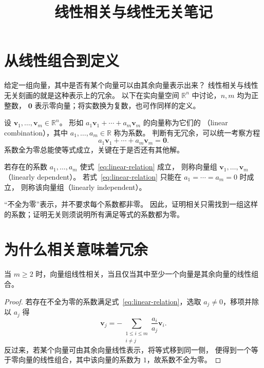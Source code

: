 \documentclass[UTF8,12pt,a4paper,fontset=fandol]{ctexart}
\title{线性相关与线性无关笔记}
\author{}
\date{}
\begin{document}
\maketitle

\section{从线性组合到定义}

给定一组向量，其中是否有某个向量可以由其余向量表示出来？
线性相关与线性无关刻画的就是这种表示上的冗余。
以下在实向量空间 $\mathbb R^n$ 中讨论，$n,m$ 均为正整数，
$\boldsymbol{0}$ 表示零向量；将实数换为复数，也可作同样的定义。

设 $\boldsymbol{v}_1,\ldots,\boldsymbol{v}_m\in\mathbb R^n$。
形如 $a_1\boldsymbol{v}_1+\cdots+a_m\boldsymbol{v}_m$ 的向量称为它们的
（linear combination），其中 $a_1,\ldots,a_m\in\mathbb R$ 称为系数。
判断有无冗余，可以统一考察方程
\begin{equation}
  a_1\boldsymbol{v}_1+\cdots+a_m\boldsymbol{v}_m=\boldsymbol{0}.
  \label{eq:linear-relation}
\end{equation}
系数全为零总能使等式成立，关键在于是否还有其他解。

\begin{definition}[线性相关与线性无关]
若存在的系数 $a_1,\ldots,a_m$ 使式~\eqref{eq:linear-relation} 成立，
则称向量组 $\boldsymbol{v}_1,\ldots,\boldsymbol{v}_m$ （linearly dependent）。
若式~\eqref{eq:linear-relation} 只能在 $a_1=\cdots=a_m=0$ 时成立，
则称该向量组（linearly independent）。
\end{definition}

“不全为零”表示，并不要求每个系数都非零。
因此，证明相关只需找到一组这样的系数；证明无关则须说明所有满足等式的系数都为零。

\section{为什么相关意味着冗余}

\begin{proposition}
当 $m\geq2$ 时，向量组线性相关，当且仅当其中至少一个向量是其余向量的线性组合。
\end{proposition}

\begin{proof}
若存在不全为零的系数满足式~\eqref{eq:linear-relation}，选取 $a_j\neq0$，移项并除以 $a_j$ 得
\[
  \boldsymbol{v}_j=-\sum_{\substack{1\leq i\leq m\\i\neq j}}
  \frac{a_i}{a_j}\boldsymbol{v}_i.
\]
反过来，若某个向量可由其余向量线性表示，将等式移到同一侧，
便得到一个等于零向量的线性组合，其中该向量的系数为 $1$，故系数不全为零。
\end{proof}
\end{document}
